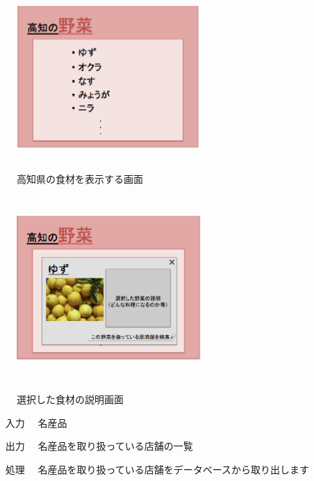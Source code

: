 \documentclass[a4j,titlepage]{jarticle}
\begin{document}
\begin {figure}[htbp]
    \begin{center}
    \includegraphics [height=7cm, width=7cm]{extrnal_design_document_image/7.eps}
    \caption {高知県の食材を表示する画面}
    \label {fig:7}
    \end{center}
\end {figure}

\begin {figure}[htbp]
    \begin{center}
    \includegraphics [height=7cm, width=7cm]{extrnal_design_document_image/8.eps}
　　    \caption {選択した食材の説明画面}
    \label {fig:8}
    \end{center}
\end {figure}

\begin{enumerate}
  \item [入力]　名産品
  \item [出力]　名産品を取り扱っている店舗の一覧
  \item [処理]　名産品を取り扱っている店舗をデータベースから取り出します
\end{enumerate}
\end{document}
